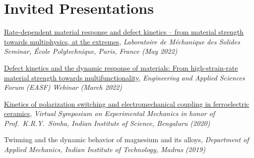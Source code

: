 \documentclass[a4paper,10pt, oneside]{article}
\begin{document}
	\section*{{Invited Presentations}}
	\begin{enumerate}[label={[\arabic*]}, leftmargin=*]
		\itemsep 5pt
		\item \href{https://www.youtube.com/watch?v=YmLRJPUaMiw}{Rate-dependent material response and defect kinetics -- from material strength towards multiphysics, at the extremes}, \textit{Laboratoire de M\'{e}chanique des Solides Seminar, \'{E}cole Polytechnique, Paris, France (May 2022)} \label{ecole2022}
		\item \href{https://www.youtube.com/watch?v=KJaa1TNWZrM&t=2661s}{Defect kinetics and the dynamic response of materials: From high-strain-rate material strength towards multifunctionality}, \textit{Engineering and Applied Sciences Forum (EASF) Webinar (March 2022)} \label{easf2022}
		\item \href{https://www.youtube.com/watch?v=U4-B_NNvWPY&ab_channel=IIScMechanicalEngineering}{Kinetics of polarization switching and electromechanical coupling in ferroelectric ceramics},\textit{ Virtual Symposium on Experimental Mechanics in honor of Prof.~K.R.Y.~Simha, Indian Institute of Science, Bengaluru (2020)} \label{iiscsimha2020}
		\item Twinning and the dynamic behavior of magnesium and its alloys, \textit{Department of Applied Mechanics, Indian Institute of Technology, Madras (2019)} \label{iitm2019}
	\end{enumerate}
	
\end{document}
